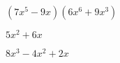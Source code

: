 \documentclass{article}
\begin{document}
\begin{multicols}{2}
\item $(7x^{5}-9x)(6x^{6}+9x^{3})$\item $5x^2+6x$\item $8x^{3}-4x^2+2x$\ite
\end{multicols}
\end{document}
